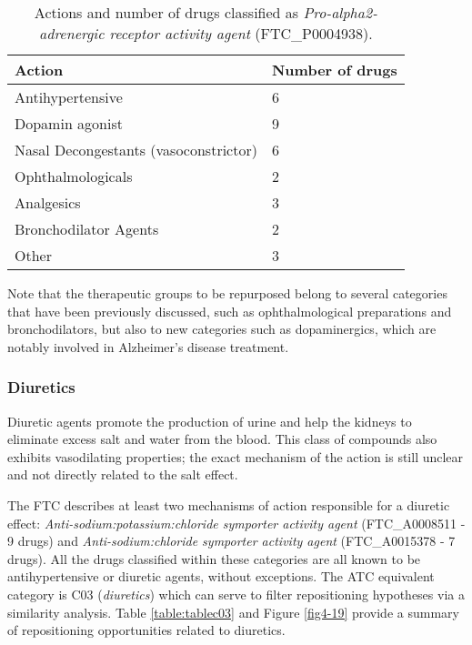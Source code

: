 \begin{table}[htbp]
\small
\begin{tabular}{|p{5cm}|p{5cm}|}
\hline
\textbf{Action} & \textbf{Number of drugs} \\ \hline
Antihypertensive  & 6 \\ \hline
Dopamin agonist & 9 \\ \hline
Nasal Decongestants (vasoconstrictor) & 6 \\ \hline
Ophthalmologicals & 2 \\ \hline
Analgesics & 3 \\ \hline
Bronchodilator Agents & 2 \\ \hline
Other & 3 \\ \hline
\end{tabular}
\caption{Actions and number of drugs classified as \emph{Pro-alpha2-adrenergic receptor activity agent} (FTC\_P0004938).}
\label{table:tablealpha}
\end{table}

Note that the therapeutic groups to be repurposed belong to several categories that have been previously discussed, such as ophthalmological preparations and bronchodilators, but also to new categories such as dopaminergics, which are notably involved in Alzheimer's disease treatment.

\subsubsection{Diuretics}
Diuretic agents promote the production of urine and help the kidneys to eliminate excess salt and water from the blood. This class of compounds also exhibits vasodilating properties; the exact mechanism of the action is still unclear and not directly related to the salt effect.

The FTC describes at least two mechanisms of action responsible for a diuretic effect: \emph{Anti-sodium:potassium:chloride symporter activity agent} (FTC\_A0008511 - 9 drugs) and \emph{Anti-sodium:chloride symporter activity agent} (FTC\_A0015378 - 7 drugs). All the drugs classified within these categories are all known to be antihypertensive or diuretic agents, without exceptions. The ATC equivalent category is C03 (\emph{diuretics}) which can serve to filter repositioning hypotheses via a similarity analysis. Table \ref{table:tablec03} and Figure \ref{fig4-19} provide a summary of repositioning opportunities related to diuretics.

